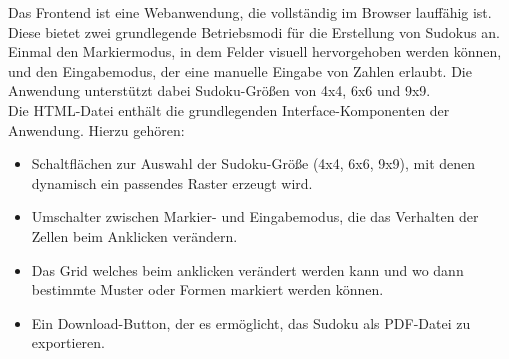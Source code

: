 Das Frontend ist eine Webanwendung, die vollständig im Browser lauffähig ist.
Diese bietet zwei grundlegende Betriebsmodi für die Erstellung von Sudokus an.
Einmal den Markiermodus, in dem Felder visuell hervorgehoben werden können,
und den Eingabemodus, der eine manuelle Eingabe von Zahlen erlaubt.
Die Anwendung unterstützt dabei Sudoku-Größen von 4x4, 6x6 und 9x9.
\\
Die HTML-Datei enthält die grundlegenden Interface-Komponenten der Anwendung. Hierzu gehören:
\begin{itemize}
    \item Schaltflächen zur Auswahl der Sudoku-Größe (4x4, 6x6, 9x9), mit denen dynamisch ein passendes Raster erzeugt wird.
    \item Umschalter zwischen Markier- und Eingabemodus, die das Verhalten der Zellen beim Anklicken verändern.
    \item Das Grid welches beim anklicken verändert werden kann und wo dann bestimmte Muster oder Formen markiert werden können.
    \item Ein Download-Button, der es ermöglicht, das Sudoku als PDF-Datei zu exportieren.
\end{itemize}


